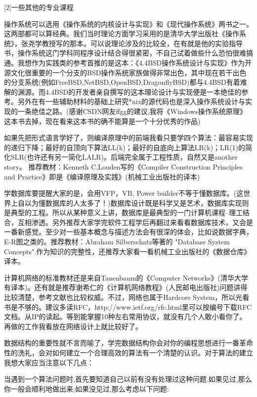 [2]一些其他的专业课程 

操作系统可以选用《操作系统的内核设计与实现》和《现代操作系统》两书之一。这两部都可以算经典。我们当时理论方面学习采用的是清华大学出版社《操作系统》，张尧学教授写的那本。可以说理论涉及的比较全，在有就是他的实验指导书，操作系统这门学科同程序设计结合得很紧密，不自己试着做些什么恐怕很难搞通。我想作为实践类的参考首推的是这本：《4.4BSD操作系统设计与实现》作为开源文化很重要的一个分支的BSD操作系统家族做得非常出色，其中现在若干出色的分支系统(例如FreeBSD,NetBSD,OpenBSD,DragonflyBSD)都与4.4BSD有着难解的渊源。而4.4BSD的开发者亲自撰写的这本理论设计与实现便是一本绝佳的参考。另外在有一些辅助材料的基础上研究*nix的源代码也是深入操作系统设计与实现的一条绝佳之路。(感谢CSDN网友ffgg的建议,我将《Windows操作系统原理》这本书去掉，现在看来这本书的确不能算是一个十分优秀的作品) 

如果先把形式语言学好了，则编译原理中的前端我看只要学四个算法：最容易实现的递归下降；最好的自顶向下算法LL(k)；最好的自底向上算法LR(k)；LR(1)的简化SLR(也许还有另一简化LALR)。后端完全属于工程性质，自然又是another story。 推荐教材：Kenneth C.Louden写的《Compiler Construction Principles and Practice》即是《编译原理及实践》(机械工业出版社的译本) 

学数据库要提醒大家的是，会用VFP，VB, Power builder不等于懂数据库。(这世界上自以为懂数据库的人太多了！)数据库设计既是科学又是艺术，数据库实现则是典型的工程。所以从某种意义上讲，数据库是最典型的一门计算机课程--理工结合，互相渗透。另外推荐大家学完软件工程学后再翻过来看看数据库技术，又会是一番新感觉。至少对一些基本概念与描述方法会有很深的体会，比如说数据字典，E-R图之类的。推荐教材：Abraham Silberschatz等著的 "Database System Concepts".作为知识的完整性，还推荐大家看一看机械工业出版社的《数据仓库》译本。 

计算机网络的标准教材还是来自Tanenbaum的《Computer Networks》(清华大学有译本)。还有就是推荐谢希仁的《计算机网络教程》(人民邮电出版社)问题讲得比较清楚，参考文献也比较权威。不过，网络也属于Hardcore System，所以光看书是不够的。建议多读RFC，http://www.ietf.org/rfc.html里可以按编号下载RFC文档。从IP的读起。等到能掌握10种左右常用协议，就没有几个人敢小看你了。再做的工作我看放在网络设计上就比较好了。 

数据结构的重要性就不言而喻了，学完数据结构你会对你的编程思想进行一番革命性的洗礼，会对如何建立一个合理高效的算法有一个清楚的认识。对于算法的建立我想大家应当注意以下几点： 

当遇到一个算法问题时,首先要知道自己以前有没有处理过这种问题.如果见过,那么你一般会顺利地做出来;如果没见过,那么考虑以下问题: 


